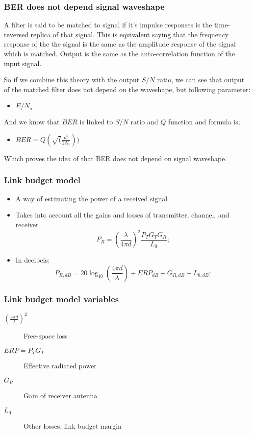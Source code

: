 \documentclass{beamer}
\begin{document}
\begin{frame}
	\frametitle{BER does not depend signal waveshape}
A filter is said to be matched to signal if it's impulse responses is the time-reversed replica of that signal. This is equivalent saying that the frequency response of the the signal is the same as the amplitude response of the signal which is matched. Output is the same as the auto-correlation function of the input signal.

So if we combine this theory with the output $S/N$ ratio, we can see that output of the matched filter does not depend on the waveshape, but following parameter:
\begin{itemize}
	\item $E/N_o$
\end{itemize}

And we know that $BER$ is linked to $S/N$ ratio and $Q$ function and formula is;
\begin{itemize}
	\item $BER= Q(\sqrt(\frac{d^2}{2 N_o }))$
\end{itemize}

Which proves the idea of that BER does not depend on signal waveshape.
\end{frame}

\begin{frame}
	\frametitle{Link budget model}
	\begin{itemize}
		\item A way of estimating the power of a received signal
		\item Takes into account all the gains and losses of transmitter, channel, and receiver
		\begin{equation}
			P_R = \left(\frac{\lambda}{4 \pi d}\right)^2 \frac{P_T G_T G_R}{L_0};
		\end{equation}
		\item In decibels:
		\begin{equation}
			P_{R, dB} = 20\log_{10}\left(\frac{4 \pi d}{\lambda}\right) + {ERP}_{dB} + G_{R, dB} - L_{0, dB};
		\end{equation}
	\end{itemize}
\end{frame}

\begin{frame}
	\frametitle{Link budget model variables}
	\begin{description}
		\item[$(\frac{4 \pi d}{\lambda})^2$] Free-space loss
		\item[$ERP = P_T G_T$] Effective radiated power
		\item[$G_R$] Gain of receiver antenna
		\item[$L_0$] Other losses, link budget margin
	\end{description}
\end{frame}
\end{document}
